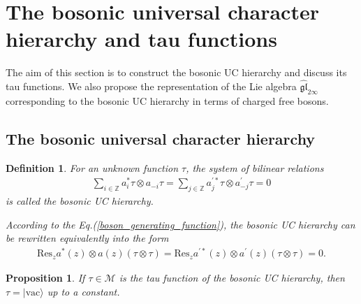 \documentclass[10pt,a4paper]{amsart}
\numberwithin{equation}{section}
\newtheorem{definition}[theorem]{Definition}
\newtheorem{proposition}[theorem]{Proposition}
\begin{document}
\section{The bosonic universal character hierarchy and tau functions}
The aim of this section is to construct the bosonic UC hierarchy  and discuss its tau functions.  We also propose the representation of the Lie algebra $\mathfrak{\widehat{gl}}_{2\infty}$ corresponding to the bosonic UC hierarchy in terms of charged free bosons.

\subsection{The bosonic universal character hierarchy}
\begin{definition}
For an unknown function $\tau$, the system of bilinear relations
\begin{eqnarray}\label{bosoc_uc_hierarchy}
\sum\limits_{i\in\mathbb{Z}}a^{\ast}_{i}\tau\otimes a_{-i}\tau=\sum\limits_{j\in\mathbb{Z}}a^{\prime\ast}_{j}\tau\otimes a^{\prime}_{-j}\tau=0
\end{eqnarray}
is called the bosonic UC hierarchy.

According to the Eq.(\ref{boson_generating_function}), the bosonic UC hierarchy can be rewritten equivalently into the form
\begin{eqnarray}
\text{Res}_{z}a^{\ast}(z)\otimes a(z)(\tau\otimes\tau)=\text{Res}_{z}a^{\prime\ast}(z)\otimes a^{\prime}(z)(\tau\otimes\tau)=0.
\end{eqnarray}
\end{definition}



\begin{proposition}\label{vac_solution}
If $\tau\in\mathcal{M}$ is the tau function of the bosonic UC hierarchy, then $\tau=|\text{vac}\rangle$ up to a constant.
\end{proposition}
\end{document}
